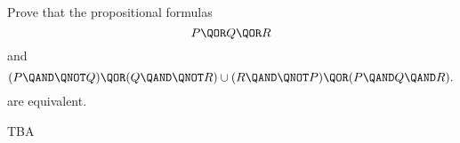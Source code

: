 \documentclass[handout]{mcs}
\begin{document}
\renewcommand{\reading}{Notes Chapters 1--3.}







\begin{problem}
Prove that the propositional formulas
\[
P \QOR Q \QOR R
\]
and
\[
(P \QAND \QNOT Q) \QOR (Q \QAND \QNOT R) \cup (R \QAND \QNOT P) \QOR (P \QAND Q \QAND R).
\]
are equivalent.

\begin{solution}
TBA
\end{solution}
\end{problem}


\end{document}

